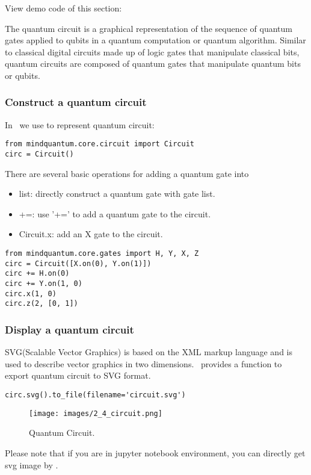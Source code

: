View demo code of this section: 

The quantum circuit is a graphical representation of the sequence of quantum gates applied to qubits in a quantum computation or quantum algorithm. Similar to classical digital circuits made up of logic gates that manipulate classical bits, quantum circuits are composed of quantum gates that manipulate quantum bits or qubits.

\subsubsection{Construct a quantum circuit}
In \MindQuantum\ we use \Circuit to represent quantum circuit:

\begin{lstlisting}
from mindquantum.core.circuit import Circuit
circ = Circuit()
\end{lstlisting}

There are several basic operations for adding a quantum gate into \Circuit
\begin{itemize}
    \item list: directly construct a quantum gate with gate list.
    \item +=: use '+=' to add a quantum gate to the circuit.
    \item Circuit.x: add an X gate to the circuit.
\end{itemize}
\begin{lstlisting}
from mindquantum.core.gates import H, Y, X, Z
circ = Circuit([X.on(0), Y.on(1)])
circ += H.on(0)
circ += Y.on(1, 0)
circ.x(1, 0)
circ.z(2, [0, 1])
\end{lstlisting}

\subsubsection{Display a quantum circuit}
SVG(Scalable Vector Graphics) is based on the XML markup language and is used to describe vector graphics in two dimensions. \MindQuantum\ provides a function to export quantum circuit to SVG format.
\begin{lstlisting}
circ.svg().to_file(filename='circuit.svg')
\end{lstlisting}
\begin{figure}[h]
    \begin{center}
        \texttt{[image: images/2\_4\_circuit.png]}
    \end{center}
    \caption{Quantum Circuit.}
\end{figure}
Please note that if you are in jupyter notebook environment, you can directly get svg image by .


